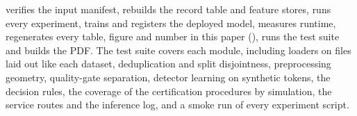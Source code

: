  verifies the input manifest, rebuilds the record table and feature stores, runs every experiment, trains and registers the deployed model, measures runtime, regenerates every table, figure and number in this paper (), runs the test suite and builds the PDF. The test suite covers each module, including loaders on files laid out like each dataset, deduplication and split disjointness, preprocessing geometry, quality-gate separation, detector learning on synthetic tokens, the decision rules, the coverage of the certification procedures by simulation, the service routes and the inference log, and a smoke run of every experiment script.
